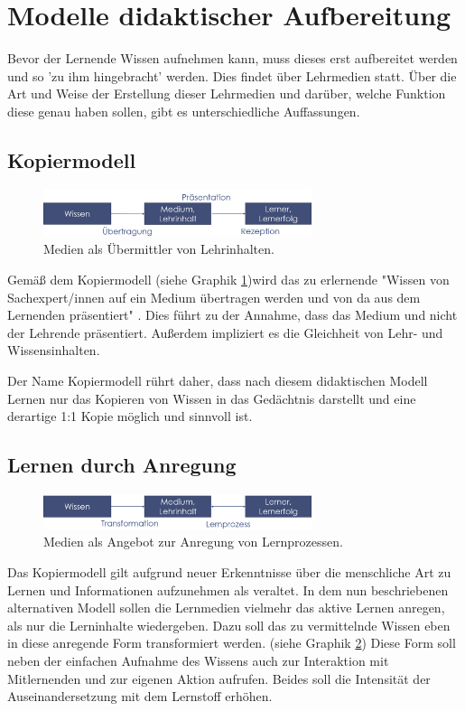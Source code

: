\section{Modelle didaktischer Aufbereitung}
\label{sec:Lernmodelle}
Bevor der Lernende Wissen aufnehmen kann, muss dieses erst aufbereitet werden und so 'zu ihm hingebracht' werden. Dies findet über Lehrmedien statt. Über die Art und Weise der Erstellung dieser Lehrmedien und darüber, welche Funktion diese genau haben sollen, gibt es unterschiedliche Auffassungen.

\subsection{Kopiermodell}
\label{sub:Kopiermodell}
\begin{figure}[h]
	\centering
	\includegraphics[width=0.7\textwidth]{Abbildungen/Kopiermodell.PNG}
	\caption{Medien als Übermittler von Lehrinhalten. \cite[S. 146]{Kerres.2001}}
	\label{fig:Kerres2001_Kopiermodell}
\end{figure}
Gemäß dem Kopiermodell (siehe Graphik \ref{fig:Kerres2001_Kopiermodell})wird das zu erlernende "Wissen von Sachexpert/innen auf ein Medium übertragen werden und von da aus dem Lernenden präsentiert" \cite[S. 146]{Kerres.2001}. Dies führt zu der Annahme, dass das Medium und nicht der Lehrende präsentiert. Außerdem impliziert es die Gleichheit von Lehr- und Wissensinhalten.

Der Name Kopiermodell rührt daher, dass nach diesem didaktischen Modell Lernen nur das Kopieren von Wissen in das Gedächtnis darstellt und eine derartige 1:1 Kopie möglich und sinnvoll ist. \cite[S. 145 f.]{Kerres.2001}

\subsection{Lernen durch Anregung}
\label{sub:LernenDurchAnregung}
\begin{figure}[h]
	\centering
	\includegraphics[width=0.7\textwidth]{Abbildungen/Anregungsmodell.PNG}
	\caption{Medien als Angebot zur Anregung von Lernprozessen. \cite[S. 147]{Kerres.2001}}
	\label{fig:Kerres2001_LernenDurchAnregung}
\end{figure}
Das Kopiermodell gilt aufgrund neuer Erkenntnisse über die menschliche Art zu Lernen und Informationen aufzunehmen als veraltet.
In dem nun beschriebenen alternativen Modell sollen die Lernmedien vielmehr das aktive Lernen anregen, als nur die Lerninhalte wiedergeben. 
Dazu soll das zu vermittelnde Wissen eben in diese anregende Form transformiert werden. (siehe Graphik \ref{fig:Kerres2001_LernenDurchAnregung}) Diese Form soll neben der einfachen Aufnahme des Wissens auch zur Interaktion mit Mitlernenden und zur eigenen Aktion aufrufen. Beides soll die Intensität der Auseinandersetzung mit dem Lernstoff erhöhen. \cite[S. 147 f.]{Kerres.2001}